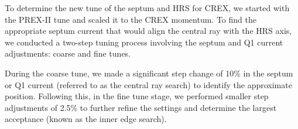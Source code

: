 \begin{comment}
    PREX tune B: p7 in https://prex.jlab.org/DocDB/0001/000112/001/OpticsCalc.pdf
    \begin{equation}
	\begin{pmatrix}
	    x_{fp}  \\
	    \theta_{fp}  \\
	    y_{fp}  \\
	    \phi_{fp}  \\
	    \delta_{fp}  \\
	\end{pmatrix}
	=
	\begin{pmatrix}
	    -3.09   & -0.02 & 0	& 0 & 16.73 \\
	    -0.31   & -0.32 & 0	& 0 & 2.5   \\
	    0	& 0 & 2.11  & 0.01  & -0.48 \\
	    0	& 0 & 1.1   & 0.48  & -0.19 \\
	    0	& 0 & 0	& 0 & 1	\\
	\end{pmatrix}
	\begin{pmatrix}
	    x_{tg}  \\
	    \theta_{tg}  \\
	    y_{tg}  \\
	    \phi_{tg}  \\
	    \delta_{tg}  \\
	\end{pmatrix}
    \end{equation}
\end{comment}

To determine the new tune of the septum and HRS for CREX, we started with the
PREX-II tune and scaled it to the CREX momentum. To find the appropriate septum 
current that would align the central ray with the HRS axis, we conducted a two-step
tuning process involving the septum and Q1 current adjustments: coarse and fine tunes. 

During the coarse tune, we made a significant step change of 10\% in the septum or Q1 current (referred to as the central ray search) to identify the approximate position. Following this, in the fine tune stage, we performed smaller step adjustments of 2.5\% to further refine the settings and determine the largest acceptance (known as the inner edge search).

